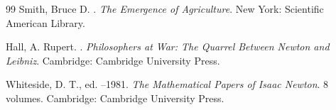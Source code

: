 \documentclass[11pt]{article}
\theoremstyle{plain}
\begin{document}
{\begin{thebibliography}{99}
Smith, Bruce D.
.
\newblock \emph{The Emergence of Agriculture}.
\newblock New York: Scientific American Library.

Hall, A. Rupert.
.
\newblock \emph{Philosophers at War: The Quarrel Between Newton and Leibniz}.
\newblock Cambridge: Cambridge University Press.

Whiteside, D. T., ed.
--1981.
\newblock \emph{The Mathematical Papers of Isaac Newton}. 8 volumes.
\newblock Cambridge: Cambridge University Press.

\end{thebibliography}
}
\end{document}
